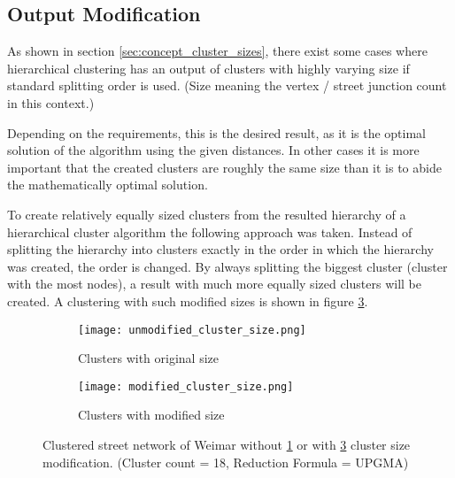 \pagebreak
\subsection{Output Modification} \label{sec:outout_modification}
As shown in section \ref{sec:concept_cluster_sizes}, there exist some cases where hierarchical clustering has an output of clusters with highly varying size if standard splitting order is used. (Size meaning the vertex / street junction count in this context.)

Depending on the requirements, this is the desired result, as it is the optimal solution of the algorithm using the given distances. In other cases it is more important that the created clusters are roughly the same size than it is to abide the mathematically optimal solution.

To create relatively equally sized clusters from the resulted hierarchy of a hierarchical cluster algorithm the following approach was taken. Instead of splitting the hierarchy into clusters exactly in the order in which the hierarchy was created, the order is changed. By always splitting the biggest cluster (cluster with the most nodes), a result with much more equally sized clusters will be created. A clustering with such modified sizes is shown in figure \ref{fig:modified_cluster_size}.

\begin{figure}
    \centering
    \begin{subfigure}[b]{0.49\textwidth}
        \begin{mdframed}[style=mdthight, userdefinedwidth=0.9\linewidth]
            \texttt{[image: unmodified\_cluster\_size.png]}
        \end{mdframed}
        \caption{Clusters with original size}
        \label{fig:unmodified_cluster_size}
    \end{subfigure}
    \begin{subfigure}[b]{0.49\textwidth}
        \begin{mdframed}[style=mdthight, userdefinedwidth=0.9\linewidth]
            \texttt{[image: modified\_cluster\_size.png]}
        \end{mdframed}
        \caption{Clusters with modified size}
        \label{fig:modified_cluster_size}
    \end{subfigure}
    \caption{Clustered street network of Weimar without \ref{fig:unmodified_cluster_size} or with \ref{fig:modified_cluster_size} cluster size modification. (Cluster count = 18, Reduction Formula = \acrshort{UPGMA})}
\end{figure}

